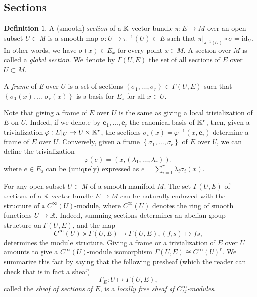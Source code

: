 \documentclass[11pt,a4paper]{book}
\theoremstyle{remark} \newtheorem{rmk}[thm]{Remark}
\theoremstyle{definition} \newtheorem{defn}[thm]{Definition}
\theoremstyle{definition} \newtheorem{ex}[thm]{Example}
\theoremstyle{definition} \newtheorem{ej}[thm]{Exercise}
\begin{document}
\subsection{Sections}
\begin{defn}
A (smooth) \emph{section} of a $\mathbb K$-vector bundle $\pi:E\rightarrow M$ over an open subset $U\subset M$ is a smooth map $\sigma:U\rightarrow \pi^{-1}(U)\subset E$ such that $\pi|_{\pi^{-1}(U)} \circ \sigma = \mathrm{id}_{U}$. In other words, we have $\sigma(x)\in E_x$ for every point $x\in M$. A section over $M$ is called a \emph{global section}. We denote by $\Gamma(U,E)$ the set of all sections of $E$ over $U\subset M$.

A \emph{frame} of $E$ over $U$ is a set of sections $\left\{ \sigma_1,\dots,\sigma_r \right\} \subset \Gamma(U,E)$ such that $\left\{ \sigma_1(x),\dots,\sigma_r(x) \right\}$ is a basis for $E_x$ for all $x\in U$.
\end{defn}

Note that giving a frame of $E$ over $U$ is the same as giving a local trivialization of $E$ on $U$. Indeed, if we denote by $\bm{e}_1,\dots,\bm{e}_r$ the canonical basis of $\mathbb K^r$, then, given a trivialization $\varphi:E|_U \rightarrow U \times \mathbb K^r$, the sections $\sigma_i(x)=\varphi^{-1}(x,\bm{e}_i)$ determine a frame of $E$ over $U$. Conversely, given a frame $\left\{ \sigma_1,\dots,\sigma_r \right\}$ of $E$ over $U$, we can define the trivialization
\begin{equation*}
\varphi(e) = (x,(\lambda_1,\dots,\lambda_r)),
\end{equation*}
where $e\in E_x$ can be (uniquely) expressed as $e=\sum_{i=1}^r \lambda_i \sigma_i(x)$.

For any open subset $U\subset M$ of a smooth manifold $M$. The set $\Gamma(U,E)$ of sections of a $\mathbb K$-vector bundle $E\rightarrow M$ can be naturally endowed with the structure of a $C^\infty(U)$-module, where $C^\infty(U)$ denotes the ring of smooth functions $U\rightarrow \mathbb R$. Indeed, summing sections determines an abelian group structure on $\Gamma(U,E)$, and the map
\begin{equation*}
C^\infty(U) \times \Gamma(U,E) \rightarrow \Gamma(U,E), (f,s) \mapsto f s,
\end{equation*}
determines the module structure. Giving a frame or a trivialization of $E$ over $U$ amounts to give a $C^\infty(U)$-module isomorphism $\Gamma(U,E)\cong C^\infty(U)^r$. We summarize this fact by saying that the following presheaf (which the reader can check that is in fact a sheaf)
\begin{equation*}
\Gamma_E : U \mapsto \Gamma(U,E),
\end{equation*}
called the \emph{sheaf of sections of $E$}, is a \emph{locally free sheaf of $C^\infty_M$-modules}.
\end{document}
